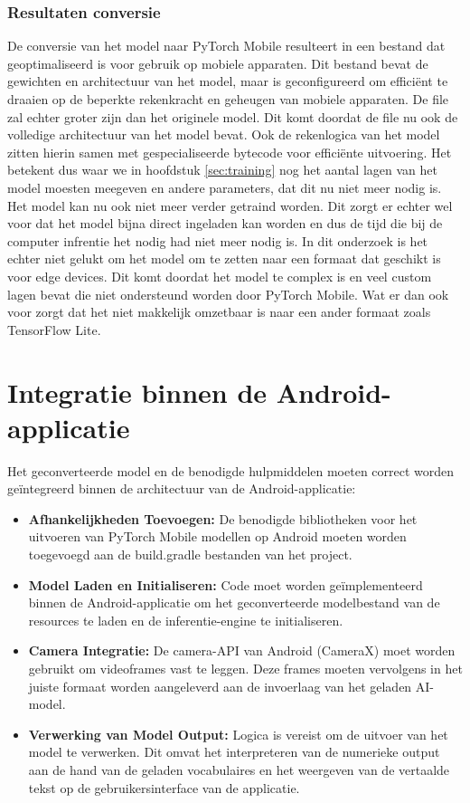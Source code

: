 \subsubsection{Resultaten conversie}
\label{subsubsec:resultaten-conversie}
De conversie van het model naar PyTorch Mobile resulteert in een bestand dat geoptimaliseerd is voor gebruik op mobiele apparaten.
Dit bestand bevat de gewichten en architectuur van het model, maar is geconfigureerd om efficiënt te draaien op de beperkte rekenkracht en geheugen van mobiele apparaten.
De file zal echter groter zijn dan het originele model.
Dit komt doordat de file nu ook de volledige architectuur van het model bevat.
Ook de rekenlogica van het model zitten hierin samen met gespecialiseerde bytecode voor effici{\"e}nte uitvoering.
Het betekent dus waar we in hoofdstuk \ref{sec:training} nog het aantal lagen van het model moesten meegeven en andere parameters, dat dit nu niet meer nodig is.
Het model kan nu ook niet meer verder getraind worden.
Dit zorgt er echter wel voor dat het model bijna direct ingeladen kan worden en dus de tijd die bij de computer infrentie het nodig had niet meer nodig is.
In dit onderzoek is het echter niet gelukt om het model om te zetten naar een formaat dat geschikt is voor edge devices.
Dit komt doordat het model te complex is en veel custom lagen bevat die niet ondersteund worden door PyTorch Mobile.
Wat er dan ook voor zorgt dat het niet makkelijk omzetbaar is naar een ander formaat zoals TensorFlow Lite.
\section{Integratie binnen de Android-applicatie}
\label{subsec:integratie-android}

Het geconverteerde model en de benodigde hulpmiddelen moeten correct worden geïntegreerd binnen de architectuur van de Android-applicatie:
\begin{itemize}
    \item \textbf{Afhankelijkheden Toevoegen:} De benodigde bibliotheken voor het uitvoeren van PyTorch Mobile modellen op Android moeten worden toegevoegd aan de build.gradle bestanden van het project.
    \item \textbf{Model Laden en Initialiseren:} Code moet worden geïmplementeerd binnen de Android-applicatie om het geconverteerde modelbestand van de resources te laden en de inferentie-engine te initialiseren.
    \item \textbf{Camera Integratie:} De camera-API van Android (CameraX) moet worden gebruikt om videoframes vast te leggen. 
    Deze frames moeten vervolgens in het juiste formaat worden aangeleverd aan de invoerlaag van het geladen AI-model.
    \item \textbf{Verwerking van Model Output:} Logica is vereist om de uitvoer van het model te verwerken. 
    Dit omvat het interpreteren van de numerieke output aan de hand van de geladen vocabulaires en het weergeven van de vertaalde tekst op de gebruikersinterface van de applicatie.
\end{itemize}